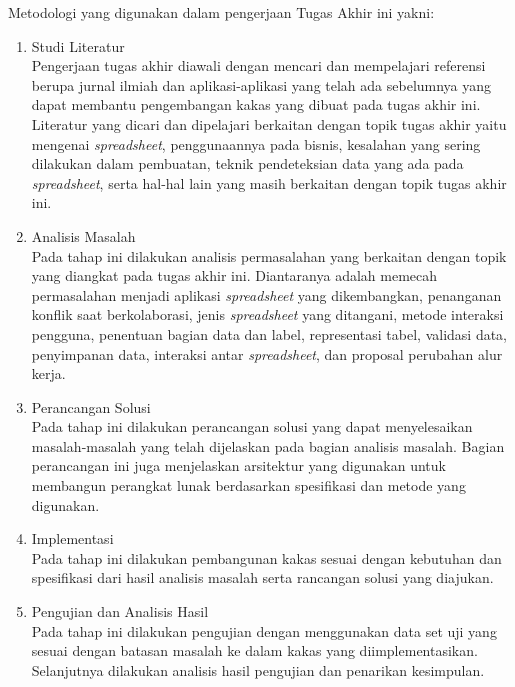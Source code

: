 Metodologi yang digunakan dalam pengerjaan Tugas Akhir ini yakni:
\begin{enumerate}
    \item Studi Literatur \\
          Pengerjaan tugas akhir diawali dengan mencari dan mempelajari referensi berupa jurnal ilmiah dan aplikasi-aplikasi yang telah ada sebelumnya yang dapat membantu pengembangan kakas yang dibuat pada tugas akhir ini. Literatur yang dicari dan dipelajari berkaitan dengan topik tugas akhir yaitu mengenai \textit{spreadsheet}, penggunaannya pada bisnis, kesalahan yang sering dilakukan dalam pembuatan, teknik pendeteksian data yang ada pada \textit{spreadsheet}, serta hal-hal lain yang masih berkaitan dengan topik tugas akhir ini.

    \item Analisis Masalah \\
          Pada tahap ini dilakukan analisis permasalahan yang berkaitan dengan topik yang diangkat pada tugas akhir ini. Diantaranya adalah memecah permasalahan menjadi aplikasi \textit{spreadsheet} yang dikembangkan, penanganan konflik saat berkolaborasi, jenis \textit{spreadsheet} yang ditangani, metode interaksi pengguna, penentuan bagian data dan label, representasi tabel, validasi data, penyimpanan data, interaksi antar \textit{spreadsheet}, dan proposal perubahan alur kerja.

    \item Perancangan Solusi \\
          Pada tahap ini dilakukan perancangan solusi yang dapat menyelesaikan masalah-masalah yang telah dijelaskan pada bagian analisis masalah. Bagian perancangan ini juga menjelaskan arsitektur yang digunakan untuk membangun perangkat lunak berdasarkan spesifikasi dan metode yang digunakan.

    \item Implementasi \\
          Pada tahap ini dilakukan pembangunan kakas sesuai dengan kebutuhan dan spesifikasi dari hasil analisis masalah serta rancangan solusi yang diajukan.

    \item Pengujian dan Analisis Hasil \\
          Pada tahap ini dilakukan pengujian dengan menggunakan data set uji yang sesuai dengan batasan masalah ke dalam kakas yang diimplementasikan. Selanjutnya dilakukan analisis hasil pengujian dan penarikan kesimpulan.

\end{enumerate}

